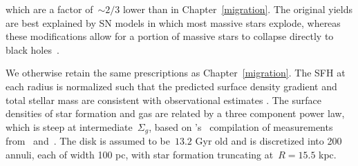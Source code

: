 which are a factor of~$\sim$$2 / 3$ lower than in Chapter~\ref{migration}.
The original yields are best explained by SN models in which most massive stars
explode, whereas these modifications allow for a portion of massive stars to
collapse directly to black holes~\citep{OConnor2011, Pejcha2015, Gerke2015,
Ertl2016, Sukhbold2016, Adams2017, Basinger2021, Griffith2021b}.
\par
We otherwise retain the same prescriptions as Chapter~\ref{migration}.
The SFH at each radius is normalized such that the predicted surface density
gradient and total stellar mass are consistent with observational estimates
\citep{Bland-Hawthorn2016, Licquia2015}.
The surface densities of star formation and gas are related by a three
component power law, which is steep at intermediate~$\Sigma_g$, based on
\citeauthor{Krumholz2018b}'s~\citeyearpar{Krumholz2018b} compilation of
measurements from~\citet{Bigiel2010} and~\citet{Leroy2013}.
The disk is assumed to be~$13.2$ Gyr old and is discretized into 200 annuli,
each of width 100 pc, with star formation truncating at~$R = 15.5$ kpc.


